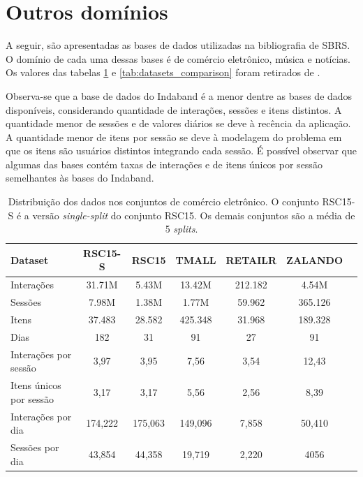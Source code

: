 \section{Outros domínios}
 A seguir, são apresentadas as bases de dados utilizadas na bibliografia de
  SBRS. O domínio de cada uma dessas bases é de comércio eletrônico, música e
  notícias. Os valores das tabelas \ref{tab:datasets} e
  \ref{tab:datasets_comparison} foram retirados de \citet{ludewig_2018}.

  Observa-se que a base de dados do Indaband é a menor dentre as bases de dados
  disponíveis, considerando quantidade de interações, sessões e itens distintos.
  A quantidade menor de sessões e de valores diários se deve à recência da
  aplicação. A quantidade menor de itens por sessão se deve à modelagem do
  problema em que os itens são usuários distintos integrando cada sessão.
  É possível observar que algumas das bases contém taxas de interações e
  de itens únicos por sessão semelhantes às bases do Indaband.
  
  \begin{table}[htbp]
    \centering
    \begin{tabular}{lcccccc}
        \toprule
        \textbf{Dataset} & \textbf{RSC15-S} & \textbf{RSC15} & \textbf{TMALL} & \textbf{RETAILR} & \textbf{ZALANDO} \\
        \midrule
        Interações & 31.71M & 5.43M & 13.42M & 212.182 & 4.54M \\
        Sessões & 7.98M & 1.38M & 1.77M & 59.962 & 365.126 \\
        Itens & 37.483 & 28.582 & 425.348 & 31.968 & 189.328 \\
        Dias & 182 & 31 & 91 & 27 & 91 \\
        \hline
        Interações por sessão & 3,97 & 3,95 & 7,56 & 3,54 & 12,43 \\ 
        Itens únicos por sessão & 3,17 & 3,17 & 5,56 & 2,56 & 8,39 \\ 
        Interações por dia & 174,222 & 175,063 & 149,096 & 7,858 & 50,410 \\
        Sessões por dia & 43,854 & 44,358 & 19,719 & 2,220 & 4056 \\ 
        \bottomrule
    \end{tabular}
    \caption{Distribuição dos dados nos conjuntos de comércio eletrônico. O
    conjunto RSC15-S é a versão \textit{single-split} do conjunto RSC15. Os demais
    conjuntos são a média de 5 \textit{splits}. }
    \label{tab:datasets}
  \end{table}
  

